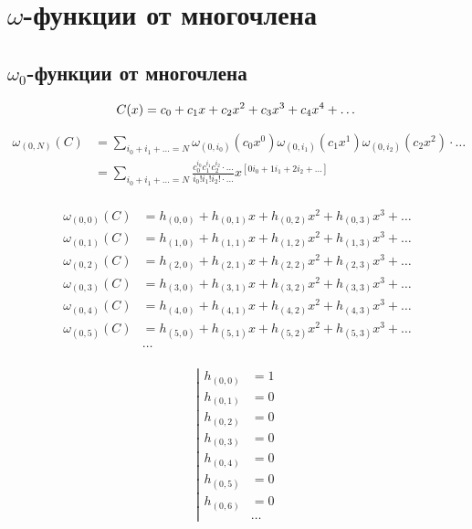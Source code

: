 
\section{$\omega$-функции от многочлена}

\subsection{$\omega_0$-функции от многочлена}

\begin{equation*}
C(x) = c_0 + c_1 x + c_2 x^2 + c_3 x^3 + c_4 x^4 + \ldots \\
\end{equation*}

\begin{equation*}\begin{aligned}
\omega_{(0,N)}(C) &= \sum_{i_0 + i_1 + \ldots = N}
{
  \omega_{(0,i_0)}(c_0 x^0)
  \omega_{(0,i_1)}(c_1 x^1)
  \omega_{(0,i_2)}(c_2 x^2)
  \cdot
  \ldots
} \\
&= \sum_{i_0 + i_1 + \ldots = N}
{
  \frac{c_0^{i_0} c_1^{i_1} c_2^{i_2} \cdot \ldots}{i_0! i_1! i_2! \cdot \ldots}
  x^{[0 i_0 + 1 i_1 + 2 i_2 + \ldots]}
} \\
\end{aligned}\end{equation*}

\begin{equation*} \begin{aligned}
\omega_{(0,0)}(C) &= h_{(0,0)} + h_{(0,1)} x + h_{(0,2)} x^2 + h_{(0,3)} x^3 + \ldots \\
\omega_{(0,1)}(C) &= h_{(1,0)} + h_{(1,1)} x + h_{(1,2)} x^2 + h_{(1,3)} x^3 + \ldots \\
\omega_{(0,2)}(C) &= h_{(2,0)} + h_{(2,1)} x + h_{(2,2)} x^2 + h_{(2,3)} x^3 + \ldots \\
\omega_{(0,3)}(C) &= h_{(3,0)} + h_{(3,1)} x + h_{(3,2)} x^2 + h_{(3,3)} x^3 + \ldots \\
\omega_{(0,4)}(C) &= h_{(4,0)} + h_{(4,1)} x + h_{(4,2)} x^2 + h_{(4,3)} x^3 + \ldots \\
\omega_{(0,5)}(C) &= h_{(5,0)} + h_{(5,1)} x + h_{(5,2)} x^2 + h_{(5,3)} x^3 + \ldots \\
&\ldots \\
\end{aligned} \end{equation*}

\begin{equation*} \left| \begin{aligned} 
h_{(0,0)} &= 1 \\ 
h_{(0,1)} &= 0 \\
h_{(0,2)} &= 0 \\
h_{(0,3)} &= 0 \\
h_{(0,4)} &= 0 \\
h_{(0,5)} &= 0 \\
h_{(0,6)} &= 0 \\
&\ldots
\end{aligned} \right. \end{equation*}

